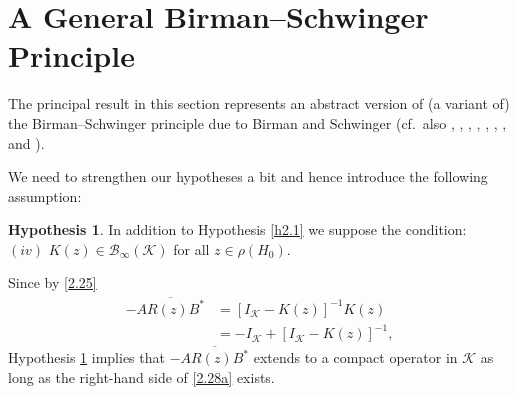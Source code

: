\documentclass[reqno,10pt, centertags]{amsart}
\newcommand{\cB}{{\mathcal B}}
\newcommand{\cK}{{\mathcal K}}
\newcommand{\lb}{\label}
\newcommand{\ol}{\overline}
\numberwithin{equation}{section}
\theoremstyle{definition}
\newtheorem{hypothesis}[theorem]{Hypothesis}
\begin{document}
\section{A General Birman--Schwinger Principle} \lb{s3}

The principal result in this section represents an abstract version
of (a variant of) the Birman--Schwinger principle due to Birman \cite{Bi61}
and Schwinger \cite{Sc61} (cf.\ also \cite{BS91}, \cite{GH87},
\cite{Kl82}, \cite{KS80}, \cite{Ne83}, \cite{Ra80}, \cite{Se74}, and
\cite{Si77a}).

We need to strengthen our hypotheses a bit and hence introduce the following
assumption:

\begin{hypothesis} \lb{h2.5}
In addition to Hypothesis \ref{h2.1} we suppose the condition: \\
$(iv)$ $K(z)\in\cB_\infty(\cK)$ for all $z\in\rho(H_0)$.
\end{hypothesis}

Since by \eqref{2.25}
\begin{align}
-\ol{AR(z)B^*}&=[I_{\cK}-K(z)]^{-1}K(z) \lb{2.28} \\
&=-I_{\cK}+[I_{\cK}-K(z)]^{-1}, \lb{2.28a}
\end{align}
Hypothesis \ref{h2.5} implies that $-\ol{AR(z)B^*}$ extends to a
compact operator in $\cK$ as long as the right-hand side of
\eqref{2.28a} exists.
\end{document}
